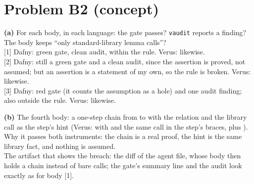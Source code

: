 \documentclass[11pt]{article}
\begin{document}
\section*{Problem B2 (concept)}\label{ans:B2}
\begin{answer}
\textbf{(a)} For each body, in each language: the gate passes? \texttt{vaudit}
reports a finding? The body keeps ``only standard-library lemma calls''? \\
{[1]} Dafny: green gate, clean audit, within the rule. \quad Verus: likewise. \\
{[2]} Dafny: still a green gate and a clean audit, since the assertion is
proved, not assumed; but an assertion is a statement of my own, so the rule
is broken. \quad Verus: likewise. \\
{[3]} Dafny: red gate (it counts the assumption as a hole) and one audit
finding; also outside the rule. \quad Verus: likewise.

\textbf{(b)} The fourth body: a one-step  chain from  to
 with the relation \dfy{<=} and the library call as the step's hint
(Verus:  with \vrs{(<=)} and the same call in the step's braces,
plus ). \\
Why it passes both instruments: the chain is a real proof, the hint is the
same library fact, and nothing is assumed. \\
The artifact that shows the breach: the diff of the agent file, whose body
then holds a chain instead of bare calls; the gate's summary line and the
audit look exactly as for body [1].
\end{answer}

\end{document}
